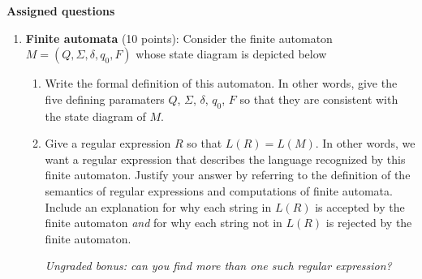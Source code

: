 {\bf Assigned questions}
\begin{enumerate}[wide, labelwidth=!, labelindent=0pt]
\item\textbf{Finite automata} (10 points):
Consider the finite automaton $M = (Q, \Sigma, \delta, q_0, F)$ whose state diagram is depicted below
\begin{center}
\end{center}
    \begin{enumerate}
    \item\gradeCompleteFirst Write the formal definition of this automaton. In other words, give the five defining paramaters $Q$, $\Sigma$, $\delta$, $q_0$, $F$ so that they are consistent with the state diagram of $M$.

    \item\gradeCorrectFirst Give a regular expression $R$ so that $L(R) = L(M)$. In other words, we want a regular expression that describes the language 
    recognized by this finite automaton. Justify your answer by referring to the 
    definition of the semantics of regular expressions and computations of finite automata. 
    Include an explanation for why each string in $L(R)$ is accepted by the finite automaton {\it and}
    for why each string not in $L(R)$ is rejected by the finite automaton.

    {\it Ungraded bonus: can you find more than one such regular expression?}


\end{enumerate}
\end{enumerate}
